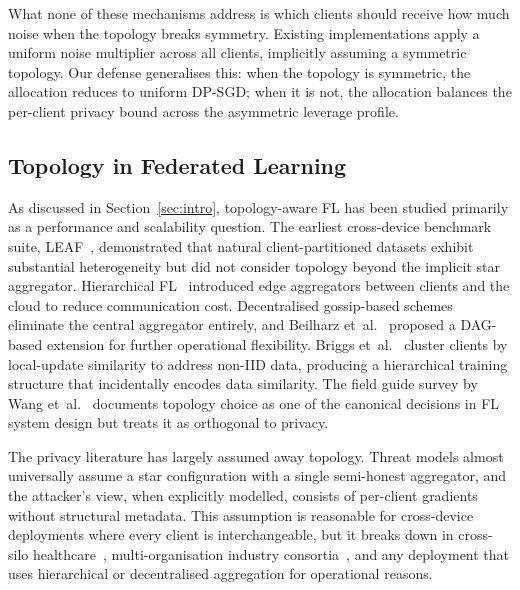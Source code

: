 \documentclass[letterpaper,journal]{IEEEtran}
\begin{document}
What none of these mechanisms address is which clients should receive
how much noise when the topology breaks symmetry. Existing
implementations apply a uniform noise multiplier across all clients,
implicitly assuming a symmetric topology. Our defense generalises
this: when the topology is symmetric, the allocation reduces to
uniform DP-SGD; when it is not, the allocation balances the
per-client privacy bound across the asymmetric leverage profile.

\subsection{Topology in Federated Learning}
\label{sec:related-topology}

As discussed in Section~\ref{sec:intro}, topology-aware FL has been
studied primarily as a performance and scalability question. The
earliest cross-device benchmark suite, LEAF~\cite{leaf2018},
demonstrated that natural client-partitioned datasets exhibit
substantial heterogeneity but did not consider topology beyond the
implicit star aggregator. Hierarchical
FL~\cite{liu2020hierarchical,abad2020icassp} introduced edge
aggregators between clients and the cloud to reduce communication
cost. Decentralised gossip-based
schemes~\cite{roy2019braintorrent,hegedus2021decentralized} eliminate
the central aggregator entirely, and Beilharz
et~al.~\cite{beilharz2021dag} proposed a DAG-based extension for
further operational flexibility. Briggs
et~al.~\cite{briggs2020hierarchical} cluster clients by local-update
similarity to address non-IID data, producing a hierarchical
training structure that incidentally encodes data similarity. The
field guide survey by Wang et~al.~\cite{wang2021fieldguide} documents
topology choice as one of the canonical decisions in FL system design
but treats it as orthogonal to privacy.

The privacy literature has largely assumed away topology. Threat
models almost universally assume a star configuration with a single
semi-honest aggregator, and the attacker's view, when explicitly
modelled, consists of per-client gradients without structural
metadata. This assumption is reasonable for cross-device deployments
where every client is interchangeable, but it breaks down in
cross-silo
healthcare~\cite{flamby2022,sheller2020medicine,dayan2021covid},
multi-organisation industry consortia~\cite{melloddy2023}, and any
deployment that uses hierarchical or decentralised aggregation for
operational reasons.
\end{document}
